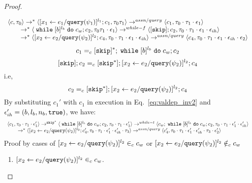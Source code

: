 \begin{proof}
\begin{case}[$\trace_2 = \trace_{ih} \cdot \event_{ih}$]
\begin{subcase}
\begin{subsubcase}
\begin{subproof}
\[
  \begin{array}{l}   
  \langle {c}, \mathtt{\tau}_0 \rangle \rightarrow^{*} 
  \langle [\mathrel{ {x}_1 \leftarrow e_1 / {\tt query}(\psi_1) }]^{l_1} ; {c}_1, \mathtt{\tau}_0 \mathtt{\tau}_1 \rangle  
  \rightarrow^{assn/query}
  \langle c_1, \mathtt{\tau}_0 \cdot \mathtt{\tau}_1 \cdot \mathtt{\epsilon}_1 \rangle 
  \\
  \qquad \rightarrow^{*} 
  \langle \;\mathtt{while}\; [b]^{l_b} \;\mathtt{do}\; c_w;{c}_2, 
  \mathtt{\tau}_0 \mathtt{\tau}_1 \cdot \mathtt{\epsilon}_1 \rangle 
  \rightarrow^{while-f} 
  \langle [\mathtt{skip}]; c_2, \mathtt{\tau}_0 \cdot \mathtt{\tau}_1 \cdot \mathtt{\epsilon}_1 \cdot \mathtt{\epsilon}_{ih} \rangle 
  \\
  \qquad \rightarrow^{*} 
  \langle [\mathrel{ {x}_2 \leftarrow e_2 / {\tt query}(\psi_2) }]^{l_2};{c}_4, 
  \mathtt{\tau}_0 \cdot \mathtt{\tau}_1 \cdot \mathtt{\epsilon}_1 \cdot \mathtt{\epsilon}_{ih} \rangle 
  \rightarrow^{assn/query} 
  \langle {c}_4,  \mathtt{\tau}_0 \cdot \mathtt{\tau}_1 \cdot \mathtt{\epsilon}_1 \cdot \mathtt{\epsilon}_{ih} \cdot \mathtt{\epsilon}_2 \rangle 
  \end{array}
\]
%
\[
  c_1 =_c [\mathtt{skip}]{}^*; \;\mathtt{while}\; [b]^{l_b} \;\mathtt{do}\; c_w;{c}_2
\]
% 
\[
  [\mathtt{skip}]; c_2 =_c [\mathtt{skip}^*];[\mathrel{ {x}_2 \leftarrow e_2 / {\tt query}(\psi_2) }]^{l_2};{c}_4
\]
i.e,
\[
  c_2 =_c [\mathtt{skip}^*];[\mathrel{ {x}_2 \leftarrow e_2 / {\tt query}(\psi_2) }]^{l_2};{c}_4
\]
%
By substituting $c_1'$ with $c_1$ in execution in Eq.~\ref{eq:valdep_inv2} and $\mathtt{\epsilon}_{ih}' = (b, l_b, n_b, \mathtt{true})$, we have:
  \begin{equation}
  \label{eq:m1testwhile_inv2}
  \begin{array}{l}   
  \langle c_1, \mathtt{\tau}_0 \cdot \mathtt{\tau}_1 \cdot \mathtt{\epsilon}_1' \rangle 
  \rightarrow^{\mathtt{skip}^*} 
  \langle \;\mathtt{while}\; [b]^{l_b} \;\mathtt{do}\; c_w;{c}_2, \mathtt{\tau}_0 \cdot \mathtt{\tau}_1 \cdot \mathtt{\epsilon}_1' \rangle 
  \rightarrow^{while-t} 
  \langle c_w;\;\mathtt{while}\; [b]^{l_b} \;\mathtt{do}\; c_w;c_2, \mathtt{\tau}_0 \cdot \mathtt{\tau}_1 \cdot \mathtt{\epsilon}_1' \cdot \mathtt{\epsilon}_{ih}' \rangle 
  \\
  \qquad \rightarrow^{*} 
  \langle [\mathrel{ {x}_2 \leftarrow e_2 / {\tt query}(\psi_2) }]^{l_2};{c}_4', 
  \mathtt{\tau}_0 \cdot \mathtt{\tau}_1 \cdot \mathtt{\epsilon}_1' \cdot \mathtt{\epsilon}_{ih}' \cdot \mathtt{\tau}_3 \rangle
  \rightarrow^{assn/query} 
  \langle {c}_4',  \mathtt{\tau}_0 \cdot \mathtt{\tau}_1 \cdot \mathtt{\epsilon}_1' \cdot \mathtt{\epsilon}_{ih}' \cdot \mathtt{\tau}_3 \cdot \mathtt{\epsilon}_2' \rangle 
\end{array}
\end{equation}
%
Proof by cases of $[\mathrel{ {x}_2 \leftarrow e_2 / {\tt query}(\psi_2) }]^{l_2} \in_c c_w$ or 
$[\mathrel{ {x}_2 \leftarrow e_2 / {\tt query}(\psi_2) }]^{l_2} \notin_c c_w$
\begin{enumerate}
  \item $[\mathrel{ {x}_2 \leftarrow e_2 / {\tt query}(\psi_2) }]^{l_2} \in_c c_w$.
  \\

\end{enumerate}
\end{subproof}
\end{subsubcase}
\end{subcase}
\end{case}
\end{proof}
